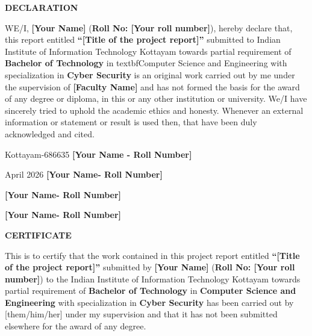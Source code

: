 \documentclass[12pt]{report}
\theoremstyle{plain}
\theoremstyle{definition}
\theoremstyle{remark}
\begin{document}
\clearpage
 \setcounter{page}{2}
\begin{center}
{\large{\bf{DECLARATION}}}
\end{center}


\noindent WE/I, \textbf{[Your Name]} (\textbf{Roll No: [Your roll
number]}), hereby declare that, this report entitled
\textbf{``[Title of the project report]''} submitted to Indian
Institute of Information Technology Kottayam towards partial
requirement of {\bf Bachelor of Technology%
} in textbf{Computer Science and Engineering} with specialization in \textbf{Cyber Security} is an original work carried out by me under the supervision of \textbf{[Faculty Name]} and has not formed the basis for the award of any degree or diploma, in this or any other institution or
university. We/I have sincerely tried to uphold the academic ethics
and honesty. Whenever an external information or statement or
result is used then, that have been duly acknowledged and cited.

\vspace{4cm}

\noindent Kottayam-686635 \hfill \textbf{[Your Name - Roll Number]}

\noindent April 2026      \hfill \textbf{[Your Name- Roll Number]}

\noindent									\hfill \textbf{[Your Name- Roll Number]}

\noindent									\hfill \textbf{[Your Name- Roll Number]}

\clearpage


 \setcounter{page}{3}
\begin{center}
{\large{\bf{CERTIFICATE}}}
\end{center}


\noindent This is to certify that the work contained in this
project report entitled \textbf{``[Title of the project report]''}
submitted by \textbf{[Your Name]} (\textbf{Roll No: [Your roll
number]}) to the Indian Institute of Information Technology Kottayam
towards partial requirement of {\bf Bachelor of Technology %
} in \textbf{Computer Science and Engineering}  with specialization in \textbf{Cyber Security} has been carried out by [them/him/her] under my
supervision and that it has not been submitted elsewhere for the
award of any degree.
\end{document}

